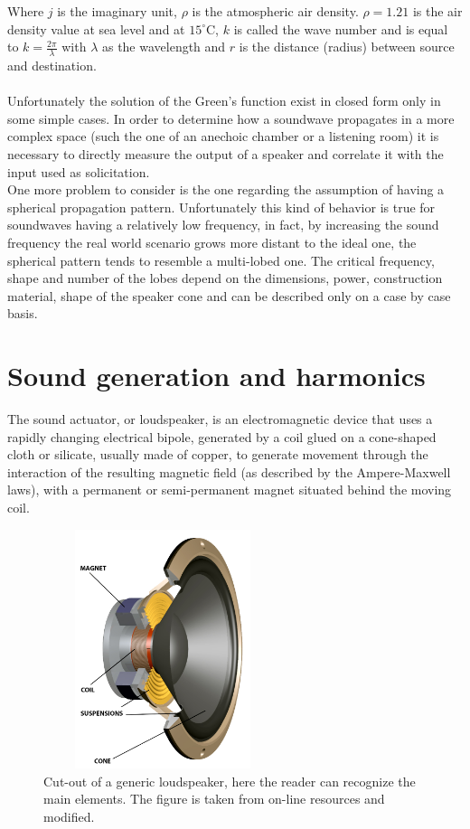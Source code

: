 Where $j$ is the imaginary unit, $\rho$ is the atmospheric air density. $\rho = 1.21$ is the air density value at sea level and at $15^{\circ}$C, $k$ is called the wave number and is equal to $k = \frac{2 \pi}{\lambda}$ with $\lambda$ as the wavelength and $r$ is the distance (radius) between source and destination. 
\\
\\
Unfortunately the solution of the Green's function exist in closed form only in some simple cases. In order to determine how a soundwave propagates in a more complex space (such the one of an anechoic chamber or a listening room) it is necessary to directly measure the output of a speaker and correlate it with the input used as solicitation.
\\
One more problem to consider is the one regarding the assumption of having a spherical propagation pattern. Unfortunately this kind of behavior is true for soundwaves having a relatively low frequency, in fact, by increasing the sound frequency the real world scenario grows more distant to the ideal one, the spherical pattern tends to resemble a multi-lobed one. The critical frequency, shape and number of the lobes depend on the dimensions, power, construction material, shape of the speaker cone and can be described only on a case by case basis.


\section{Sound generation and harmonics}
\label{sec:soundgen}

The sound actuator, or loudspeaker, is an electromagnetic device that uses a rapidly changing electrical bipole, generated by a coil glued on a cone-shaped cloth or silicate, usually made of copper, to generate movement through the interaction of the resulting magnetic field (as described by the Ampere-Maxwell laws), with a permanent or semi-permanent magnet situated behind the moving coil.
\\
\begin{figure}[th]
\centering
\includegraphics[width=7cm,height=7cm,keepaspectratio]{Figures/loudspeaker}
\decoRule
\caption[Loudspeaker representation]{Cut-out of a generic loudspeaker, here the reader can recognize the main elements. The figure is taken from on-line resources and modified.}
\label{fig:loudspeaker}
\end{figure}

